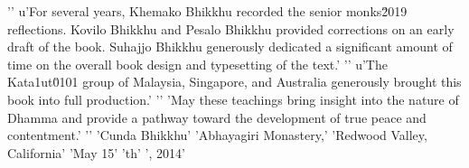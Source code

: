 '\n'
u'For several years, Khemako Bhikkhu recorded the senior monks\u2019 reflections. Kovilo Bhikkhu and Pesalo Bhikkhu provided corrections on an early draft of the book. Suhajjo Bhikkhu generously dedicated a significant amount of time on the overall book design and typesetting of the text.'
'\n'
u'The Kata\xf1ut\u0101 group of Malaysia, Singapore, and Australia generously brought this book into full production.'
'\n'
'May these teachings bring insight into the nature of Dhamma and provide a pathway toward the development of true peace and contentment.'
'\n'
'Cunda Bhikkhu'
'Abhayagiri Monastery,'
'Redwood Valley, California'
'May 15'
'th'
', 2014'
